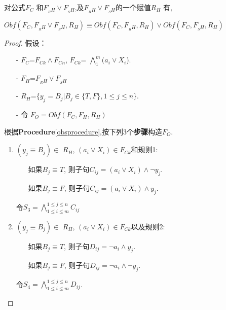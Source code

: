 \begin{lemma}\label{ORrelation-Holding-Obfuscation}
对公式$F_C$ 和$F_{_RH}\vee F_{_SH}$,及$F_{_RH} \vee F_{_SH}$的一个赋值$R_H$ 有,

$Obf(F_C,F_{_RH}\vee F_{_SH},R_H)\equiv Obf(F_C,F_{_RH},R_H) \vee Obf(F_C,F_{_SH},R_H)$
\end{lemma}
\begin{proof}
假设：
\begin{enumerate}
 \item[-]$F_C$=$F_{Ck} \wedge F_{Cn}$,  $F_{Ck}$= $\bigwedge_{1}^{m}(a_i\vee X_i$).
 \item[-]$F_H$=$F_{_RH}\vee F_{_SH}$
 \item[-]$R_H$=$\{y_j=B_j| B_j \in \{T,F\}, 1\leqslant j\leqslant n\}$.
 \item[-]令 $F_O=Obf(F_C,F_H,R_H)$
 \end{enumerate}
根据\textbf{Procedure}\ref{obsprocedure},按下列3个\textbf{步骤}构造$F_O$.
\begin{enumerate}
\item  $(y_j\equiv B_j)\in$ $R_H$, $(a_i\vee X_i) \in F_{Ck}$和规则1:
\begin{itemize}
 \item[] 如果$B_j\equiv T$, 则子句$C_{ij}=(a_i\vee X_i)\wedge \neg y_j$.
 \item[] 如果$B_j\equiv F$, 则子句$C_{ij}=(a_i\vee X_i)\wedge y_j$.
\end{itemize}
令$S_3=\bigwedge_{1\leqslant i\leqslant m}^{1\leqslant j\leqslant n} C_{ij}$
\item
$(y_j\equiv  B_j)\in $ $R_H$, $(a_i\vee X_i) \in F_{Ck}$以及规则2:
\begin{itemize}
 \item[] 如果$B_j\equiv T$, 则子句$D_{ij}=\neg a_i\wedge y_j$.
 \item[] 如果$B_j\equiv F$, 则子句$D_{ij}=\neg a_i\wedge \neg y_j$.
\end{itemize}
令$S_4=\bigwedge_{1\leqslant i\leqslant m}^{1\leqslant j\leqslant n} D_{ij}$.

\end{enumerate}
\end{proof}
